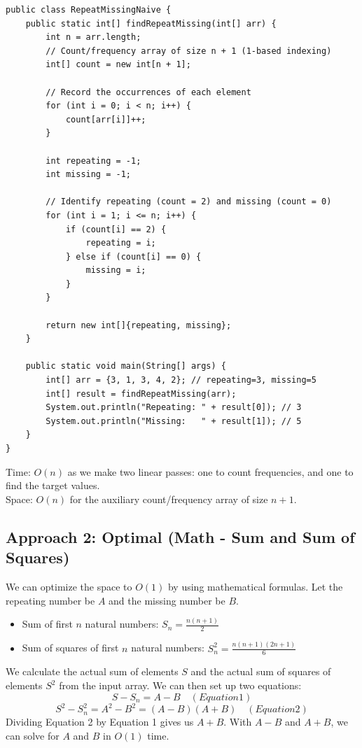 \documentclass[12pt,a4paper,oneside]{book}
\begin{document}
\begin{lstlisting}[caption={Repeating and Missing --- Naive Count Array approach, O(n) time O(n) space}]
public class RepeatMissingNaive {
    public static int[] findRepeatMissing(int[] arr) {
        int n = arr.length;
        // Count/frequency array of size n + 1 (1-based indexing)
        int[] count = new int[n + 1];

        // Record the occurrences of each element
        for (int i = 0; i < n; i++) {
            count[arr[i]]++;
        }

        int repeating = -1;
        int missing = -1;

        // Identify repeating (count = 2) and missing (count = 0)
        for (int i = 1; i <= n; i++) {
            if (count[i] == 2) {
                repeating = i;
            } else if (count[i] == 0) {
                missing = i;
            }
        }

        return new int[]{repeating, missing};
    }

    public static void main(String[] args) {
        int[] arr = {3, 1, 3, 4, 2}; // repeating=3, missing=5
        int[] result = findRepeatMissing(arr);
        System.out.println("Repeating: " + result[0]); // 3
        System.out.println("Missing:   " + result[1]); // 5
    }
}
\end{lstlisting}

\begin{complexity}
Time: $O(n)$ as we make two linear passes: one to count frequencies, and one to find the target values.\\
Space: $O(n)$ for the auxiliary count/frequency array of size $n+1$.
\end{complexity}

\subsection{Approach 2: Optimal (Math - Sum and Sum of Squares)}
We can optimize the space to $O(1)$ by using mathematical formulas. Let the repeating number be $A$ and the missing number be $B$.
\begin{itemize}
    \item Sum of first $n$ natural numbers: $S_n = \frac{n(n+1)}{2}$
    \item Sum of squares of first $n$ natural numbers: $S^2_n = \frac{n(n+1)(2n+1)}{6}$
\end{itemize}
We calculate the actual sum of elements $S$ and the actual sum of squares of elements $S^2$ from the input array. We can then set up two equations:
$$S - S_n = A - B \quad (Equation 1)$$
$$S^2 - S^2_n = A^2 - B^2 = (A-B)(A+B) \quad (Equation 2)$$
Dividing Equation 2 by Equation 1 gives us $A + B$. With $A - B$ and $A + B$, we can solve for $A$ and $B$ in $O(1)$ time.
\end{document}
